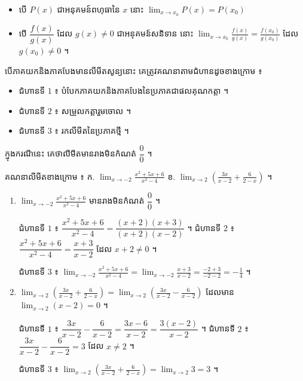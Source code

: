 \begin{formulaBox}[ជាទូទៅ]
\begin{itemize}
  \item បើ $P(x)$ ជាអនុគមន៍ពហុធានៃ $x$ នោះ $\displaystyle\lim_{x \to x_0} P(x) = P(x_0)$
  \item បើ $\dfrac{f(x)}{g(x)}$ ដែល $g(x) \ne 0$ ជាអនុគមន៍សនិទាន នោះ $\displaystyle\lim_{x \to x_0}\frac{f(x)}{g(x)} = \frac{f(x_0)}{g(x_0)}$ ដែល $g(x_0) \ne 0$ ។
\end{itemize}
\end{formulaBox}

\begin{note}[សម្គាល់]
បើភាគយកនិងភាគបែងមានលីមីតសូន្យនោះ គេត្រូវគណនាតាមជំហានដូចខាងក្រោម ៖
\begin{itemize}
  \item ជំហានទី $1$ ៖ បំបែកភាគយកនិងភាគបែងនៃប្រភាគជាផលគុណកត្តា ។
  \item ជំហានទី $2$ ៖ សម្រួលកត្តារួមចោល ។
  \item ជំហានទី $3$ ៖ រកលីមីតនៃប្រភាគថ្មី ។
\end{itemize}
ក្នុងករណីនេះ គេថាលីមីតមានរាងមិនកំណត់ $\dfrac{0}{0}$ ។
\end{note}

\begin{example}[លំហាត់គំរូ ៣]
គណនាលីមីតខាងក្រោម ៖ \quad ក. $\displaystyle\lim_{x \to -2}\frac{x^2 + 5x + 6}{x^2 - 4}$ \quad ខ. $\displaystyle\lim_{x \to 2}\left(\frac{3x}{x - 2} + \frac{6}{2 - x}\right)$ ។
\end{example}
\ans
\begin{enumerate}[a]
  \item $\displaystyle\lim_{x \to -2}\frac{x^2 + 5x + 6}{x^2 - 4}$ មានរាងមិនកំណត់ $\dfrac{0}{0}$ ។

  ជំហានទី $1$ ៖ $\dfrac{x^2 + 5x + 6}{x^2 - 4} = \dfrac{(x + 2)(x + 3)}{(x + 2)(x - 2)}$ ។ \quad ជំហានទី $2$ ៖ $\dfrac{x^2 + 5x + 6}{x^2 - 4} = \dfrac{x + 3}{x - 2}$ ដែល $x + 2 \ne 0$ ។

  ជំហានទី $3$ ៖ $\displaystyle\lim_{x \to -2}\frac{x^2 + 5x + 6}{x^2 - 4} = \lim_{x \to -2}\frac{x + 3}{x - 2} = \frac{-2 + 3}{-2 - 2} = -\frac{1}{4}$ ។
  \item $\displaystyle\lim_{x \to 2}\left(\frac{3x}{x - 2} + \frac{6}{2 - x}\right) = \lim_{x \to 2}\left(\frac{3x}{x - 2} - \frac{6}{x - 2}\right)$ ដែលមាន $\displaystyle\lim_{x \to 2}(x - 2) = 0$ ។

  ជំហានទី $1$ ៖ $\dfrac{3x}{x - 2} - \dfrac{6}{x - 2} = \dfrac{3x - 6}{x - 2} = \dfrac{3(x - 2)}{x - 2}$ ។ \quad ជំហានទី $2$ ៖ $\dfrac{3x}{x - 2} - \dfrac{6}{x - 2} = 3$ ដែល $x \ne 2$ ។

  ជំហានទី $3$ ៖ $\displaystyle\lim_{x \to 2}\left(\frac{3x}{x - 2} + \frac{6}{2 - x}\right) = \lim_{x \to 2} 3 = 3$ ។
\end{enumerate}


